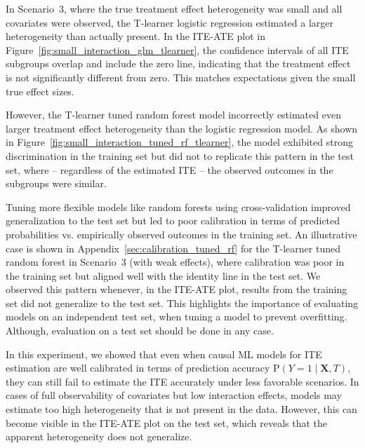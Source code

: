 

In Scenario~3, where the true treatment effect heterogeneity was small and all covariates were observed, the T-learner logistic regression estimated a larger heterogeneity than actually present. In the ITE-ATE plot in Figure~\ref{fig:small_interaction_glm_tlearner}, the confidence intervals of all ITE subgroups overlap and include the zero line, indicating that the treatment effect is not significantly different from zero. This matches expectations given the small true effect sizes.

However, the T-learner tuned random forest model incorrectly estimated even larger treatment effect heterogeneity than the logistic regression model. As shown in Figure~\ref{fig:small_interaction_tuned_rf_tlearner}, the model exhibited strong discrimination in the training set but did not to replicate this pattern in the test set, where -- regardless of the estimated ITE -- the observed outcomes in the subgroups were similar.




Tuning more flexible models like random forests using cross-validation improved generalization to the test set but led to poor calibration in terms of predicted probabilities vs. empirically observed outcomes in the training set. An illustrative case is shown in Appendix~\ref{sec:calibration_tuned_rf} for the T-learner tuned random forest in Scenario~3 (with weak effects), where calibration was poor in the training set but aligned well with the identity line in the test set. We observed this pattern whenever, in the ITE-ATE plot, results from the training set did not generalize to the test set. This highlights the importance of evaluating models on an independent test set, when tuning a model to prevent overfitting. Although, evaluation on a test set should be done in any case.

In this experiment, we showed that even when causal ML models for ITE estimation are well calibrated in terms of prediction accuracy $\text{P}(Y = 1 \mid \mathbf{X}, T)$, they can still fail to estimate the ITE accurately under less favorable scenarios. In cases of full observability of covariates but low interaction effects, models may estimate too high heterogeneity that is not present in the data. However, this can become visible in the ITE-ATE plot on the test set, which reveals that the apparent heterogeneity does not generalize.




